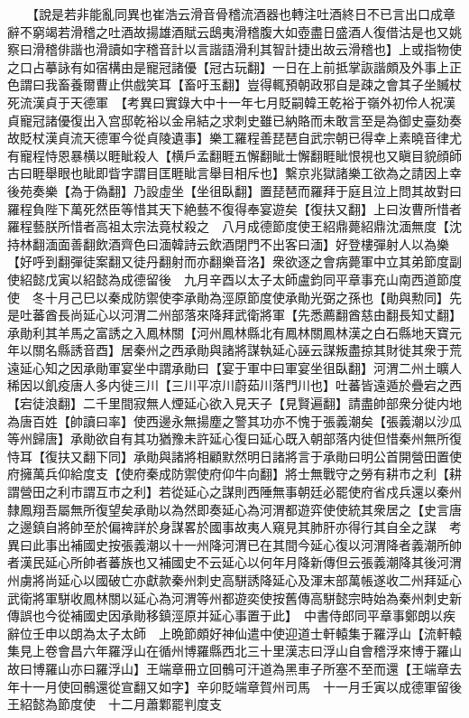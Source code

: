 　　【說是若非能亂同異也崔浩云滑音骨稽流酒器也轉注吐酒終日不已言出口成章辭不窮竭若滑稽之吐酒故揚雄酒賦云鴟夷滑稽腹大如壺盡日盛酒人復借沽是也又姚察曰滑稽俳諧也滑讀如字稽音計以言諧語滑利其智計捷出故云滑稽也】上或指物使之口占摹詠有如宿構由是寵冠諸優【冠古玩翻】一日在上前抵掌詼諧頗及外事上正色謂曰我畜養爾曹止供戲笑耳【畜吁玉翻】豈得輒預朝政邪自是疎之會其子坐贓杖死流漢貞于天德軍　【考異曰實錄大中十一年七月貶嗣韓王乾裕于嶺外初伶人祝漢貞寵冠諸優復出入宫邸乾裕以金帛結之求刺史雖已納賂而未敢言至是為御史臺劾奏故貶杖漢貞流天德軍今從貞陵遺事】樂工羅程善琵琶自武宗朝已得幸上素曉音律尤有寵程恃恩暴横以睚眦殺人【横戶孟翻睚五懈翻眦士懈翻睚眦恨視也又瞋目貌顔師古曰睚舉眼也眦即眥字謂目匡睚眦言舉目相斥也】繫京兆獄諸樂工欲為之請因上幸後苑奏樂【為于偽翻】乃設虛坐【坐徂臥翻】置琵琶而羅拜于庭且泣上問其故對曰羅程負陛下萬死然臣等惜其天下絶藝不復得奉宴遊矣【復扶又翻】上曰汝曹所惜者羅程藝朕所惜者高祖太宗法竟杖殺之　八月成德節度使王紹鼎薨紹鼎沈湎無度【沈持林翻湎面善翻飲酒齊色曰湎韓詩云飲酒閉門不出客曰湎】好登樓彈射人以為樂【好呼到翻彈徒案翻又徒丹翻射而亦翻樂音洛】衆欲逐之會病薨軍中立其弟節度副使紹懿戊寅以紹懿為成德留後　九月辛酉以太子太師盧鈞同平章事充山南西道節度使　冬十月己巳以秦成防禦使李承勛為涇原節度使承勛光弼之孫也【勛與勲同】先是吐蕃酋長尚延心以河渭二州部落來降拜武衛將軍【先悉薦翻酋慈由翻長知丈翻】承勛利其羊馬之富誘之入鳳林關【河州鳳林縣北有鳳林關鳳林漢之白石縣地天寶元年以關名縣誘音酉】居秦州之西承勛與諸將謀執延心誣云謀叛盡掠其財徙其衆于荒遠延心知之因承勛軍宴坐中謂承勛曰【宴于軍中曰軍宴坐徂臥翻】河渭二州土曠人稀因以飢疫唐人多内徙三川【三川平凉川蔚茹川落門川也】吐蕃皆遠遁於疊宕之西【宕徒浪翻】二千里間寂無人煙延心欲入見天子【見賢遍翻】請盡帥部衆分徙内地為唐百姓【帥讀曰率】使西邊永無揚塵之警其功亦不愧于張義潮矣【張義潮以沙瓜等州歸唐】承勛欲自有其功猶豫未許延心復曰延心既入朝部落内徙但惜秦州無所復恃耳【復扶又翻下同】承勛與諸將相顧默然明日諸將言于承勛曰明公首開營田置使府擁萬兵仰給度支【使府秦成防禦使府仰牛向翻】將士無戰守之勞有耕市之利【耕謂營田之利市謂互市之利】若從延心之謀則西陲無事朝廷必罷使府省戍兵還以秦州隸鳳翔吾屬無所復望矣承勛以為然即奏延心為河渭都遊弈使使統其衆居之【史言唐之邊鎮自將帥至於偏禆詳於身謀畧於國事故夷人窺見其肺肝亦得行其自全之謀　考異曰此事出補國史按張義潮以十一州降河渭已在其間今延心復以河渭降者義潮所帥者漢民延心所帥者蕃族也又補國史不云延心以何年月降新傳但云張義潮降其後河渭州虜將尚延心以國破亡亦獻款秦州刺史高駢誘降延心及渾末部萬帳遂收二州拜延心武衛將軍駢收鳳林關以延心為河渭等州都遊奕使按舊傳高駢懿宗時始為秦州刺史新傳誤也今從補國史因承勛移鎮涇原并延心事置于此】　中書侍郎同平章事鄭朗以疾辭位壬申以朗為太子太師　上晩節頗好神仙遣中使迎道士軒轅集于羅浮山【流軒轅集見上卷會昌六年羅浮山在循州博羅縣西北三十里漢志曰浮山自會稽浮來博于羅山故曰博羅山亦曰羅浮山】王端章冊立回鶻可汗道為黑車子所塞不至而還【王端章去年十一月使回鶻還從宣翻又如字】辛卯貶端章賀州司馬　十一月壬寅以成德軍留後王紹懿為節度使　十二月蕭鄴罷判度支


